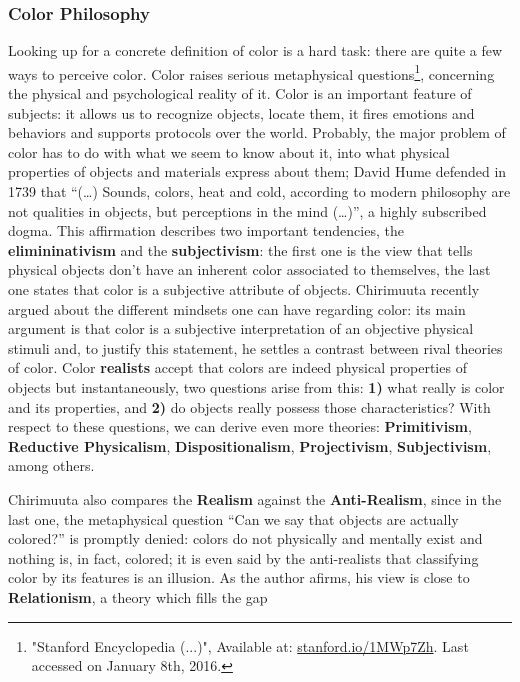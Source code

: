 \subsubsection{Color Philosophy}
\label{sec:colorphilosophy}
Looking up for a concrete definition of color is a hard task: there are quite a few ways to perceive color. Color
raises serious metaphysical questions\footnote{"Stanford Encyclopedia (...)", Available at: \url{stanford.io/1MWp7Zh}. Last accessed on January 8th, 2016.},
concerning the physical and psychological reality of it. Color is an
important feature of subjects: it allows us to recognize objects, locate them, it fires emotions and
behaviors and supports protocols over the world. Probably, the major problem of color has to do with what
we seem to know about it, into what physical properties of objects and materials express about them; David
Hume defended in 1739 \cite{Hume1739} that “(…) Sounds, colors, heat and cold, according to modern philosophy are not
qualities in objects, but perceptions in the mind (…)”, a highly subscribed dogma. This affirmation describes
two important tendencies, the \textbf{elimininativism} and the \textbf{subjectivism}: the first one is the
view that tells physical objects don’t have an inherent color associated to themselves, the last one states
that color is a subjective attribute of objects. Chirimuuta recently argued \cite{Chirimuuta2014} about the different
mindsets one can have regarding color: its main argument is that color is a subjective interpretation of
an objective physical stimuli and, to justify this statement, he settles a contrast between rival theories
of color. Color \textbf{realists} accept that colors are indeed physical properties of objects but instantaneously,
two questions arise from this: \textbf{1)} what really is color and its properties, and \textbf{2)} do objects really possess
those characteristics? With respect to these questions, we can derive even more theories: \textbf{Primitivism}, \textbf{Reductive Physicalism}, \textbf{Dispositionalism}, \textbf{Projectivism}, \textbf{Subjectivism}, among others. \par
%
Chirimuuta \cite{Chirimuuta2014} also compares the \textbf{Realism} against the \textbf{Anti-Realism}, since in the last one, the metaphysical question
“Can we say that objects are actually colored?” is promptly denied: colors do not physically and mentally
exist and nothing is, in fact, colored; it is even said by the anti-realists that classifying color by its features is an  illusion. As the author afirms, his view is close to \textbf{Relationism}, a theory which fills the gap
